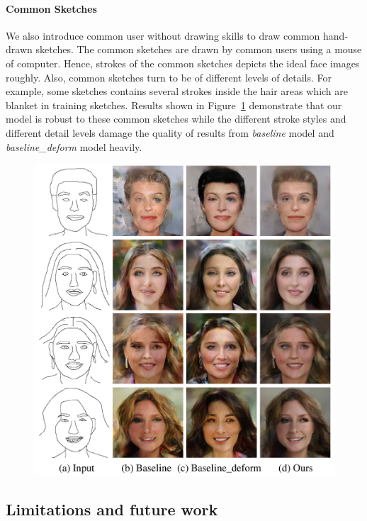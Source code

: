\paragraph{Common Sketches}
We also introduce common user without drawing skills to draw common hand-drawn sketches. The common sketches are drawn by common users using a mouse of computer. Hence, strokes of the common sketches depicts the ideal face images roughly. Also, common sketches turn to be of different levels of details. For example, some sketches contains several strokes inside the hair areas which are blanket in training sketches. Results shown in Figure~\ref{fig:common_sketches} demonstrate that our model is robust to these common sketches while the different stroke styles and different detail levels damage the quality of results from \textit{baseline} model and \textit{baseline\_deform} model heavily.


\begin{figure}
	\includegraphics[width=0.9\linewidth]{figs/commonsketches}
	\caption{}
	\label{fig:common_sketches}
\end{figure}


\subsection{Limitations and future work}

\